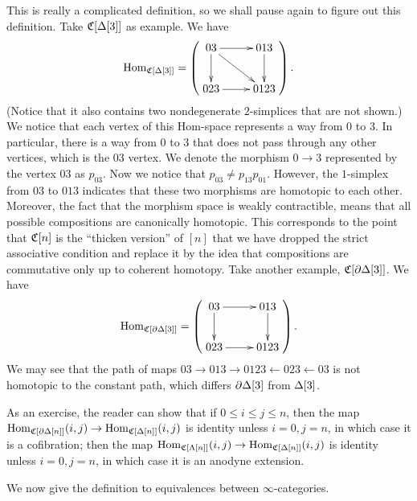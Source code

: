This is really a complicated definition, so we shall pause again to figure out this definition. Take $\mathfrak{C}[\Delta[3]]$ as example. We have
$$\Hom_{\C[\Delta[3]]}=\9\vcenter{\xymatrix{03\ar[r]\ar[d]\ar[rd]&013\ar[d]\\023\ar[r]&0123}}\0.$$
(Notice that it also contains two nondegenerate $2$-simplices that are not shown.) We notice that each vertex of this 
Hom-space represents a way from $0$ to $3$. In particular, there is a way from $0$ to $3$ that does not pass through any other vertices,
which is the $03$ vertex. We denote the morphism $0\to 3$ represented by the vertex $03$ as $p_{03}$. Now we notice that
$p_{03}\ne p_{13}p_{01}$. However, the $1$-simplex from $03$ to $013$ indicates that these two morphisms are homotopic to each other.
Moreover, the fact that the morphism space is weakly contractible, means that all possible compositions are canonically homotopic.
This corresponds to the point that $\mathfrak{C}[n]$ is the ``thicken version'' of $[n]$ that we have dropped the strict associative condition
and replace it by the idea that compositions are commutative only up to coherent homotopy. Take another example, $\mathfrak{C}[\partial\Delta[3]]$.
We have $$\Hom_{\C[\p\d[3]]}=\9\vcenter{\xymatrix{03\ar[r]\ar[d]&013\ar[d]\\023\ar[r]&0123}}\0.$$ We may see that the path of maps
$03\to 013\to 0123\leftarrow 023\leftarrow 03$ is not homotopic to the constant path, which differs $\partial\Delta[3]$ from $\Delta[3]$.

As an exercise, the reader can show that if $0\le i\le j\le n$, then the map $\operatorname{Hom}_{\mathfrak{C}[\partial\Delta[n]]}(i,j)\to\operatorname{Hom}_{\mathfrak{C}[\Delta[n]]}(i,j)$
is identity unless $i=0,j=n$, in which case it is a cofibration; then the map $\operatorname{Hom}_{\mathfrak{C}[\Lambda[n]]}(i,j)\to\operatorname{Hom}_{\mathfrak{C}[\Delta[n]]}(i,j)$
is identity unless $i=0,j=n$, in which case it is an anodyne extension.




We now give the definition to equivalences between $\infty$-categories.


